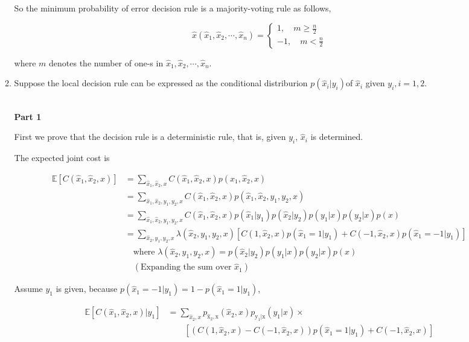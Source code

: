\documentclass[a4paper]{article}
\begin{document}
\begin{enumerate}
\begin{enumerate}
So the minimum probability of error decision rule is a majority-voting rule as follows,


\begin{equation}
  \hat x (\hat x_1, \hat x_2, \cdots, \hat x_n) = \left\{
    \begin{aligned}
      1, \quad m \geqslant \frac  n 2 \\
      -1, \quad m < \frac n 2
    \end{aligned}
    \right.
\end{equation}

where $m$ denotes the number of one-s in $\hat x_1, \hat x_2, \cdots, \hat x_n$.


\item Suppose the local decision rule can be expressed as the conditional distriburion $p(\hat x_i | y_i)$of $\hat x_i$ given $y_i,i=1,2$. 

~\\

\textbf{Part 1}

First we prove that the decision rule is a deterministic rule, that is, given $y_i$, $\hat x_i$ is determined.

The expected joint cost is 

\begin{equation}
  \begin{aligned}
    \mathbb{E}\left[ C(\hat{x}_1,\hat x_2, x)\right] &= \sum_{\hat{x}_1,\hat x_2, x} C(\hat{x}_1,\hat x_2, x) p(\hat{x}_1,\hat x_2, x) \\
   & = \sum_{\hat{x}_1,\hat x_2, y_1,y_2,x} C(\hat{x}_1,\hat x_2, x) p(\hat{x}_1,\hat x_2, y_1,y_2,x) \\
   & = \sum_{\hat{x}_1,\hat x_2, y_1,y_2,x} C(\hat{x}_1,\hat x_2, x) p(\hat{x}_1 | y_1) p(\hat{x}_2 | y_2) p(y_1|x) p(y_2|x) p(x) \\
   & = \sum_{\hat x_2,y_1,y_2,x} \lambda(\hat x_2,y_1,y_2,x)[C(1,\hat{x}_2,x)p(\hat x_1 = 1|y_1) + C(-1,\hat{x}_2,x)p(\hat x_1 = -1|y_1)]\\
   & \quad \text{where } \lambda(\hat x_2,y_1,y_2,x) =  p(\hat{x}_2 | y_2) p(y_1|x) p(y_2|x) p(x) \\
   &\quad  (\text{Expanding the sum over } \hat x_1)
  \end{aligned}
\end{equation}

Assume $y_1$ is given, because  $p(\hat x_1 = -1|y_1) =1-p(\hat x_1 = 1|y_1)$, 

\begin{equation}
  \begin{aligned}
    \mathbb{E}\left[ C(\hat{x}_1,\hat x_2, x) | y_1  \right]  & = \sum_{\hat x_2,x} p_{\hat{\mathrm{x}}_2,\mathrm{x}}(\hat x_2,x) p_{\mathrm{y}_1 | \mathrm{x}}(y_1|x)\times \\ 
    & \quad \quad \left[\left(C(1,\hat{x}_2,x)-C(-1,\hat{x}_2,x)\right) p(\hat x_1 = 1|y_1) +C(-1,\hat{x}_2,x) \right]
  \end{aligned}
\end{equation}


\end{enumerate}
\end{enumerate}
\end{document}
